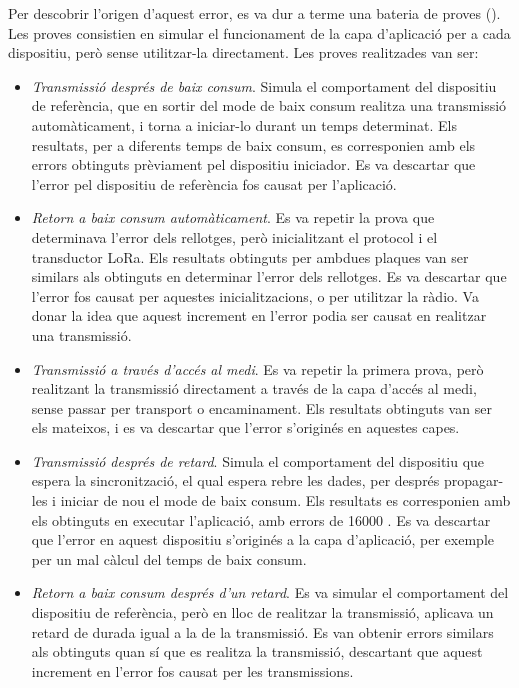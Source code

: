 \documentclass{tfgitic}[2024/07/01]
\begin{document}
{Per descobrir l'origen d'aquest error, es va dur a terme una bateria de proves (). Les proves consistien en simular el funcionament de la capa d'aplicació per a cada dispositiu, però sense utilitzar-la directament. Les proves realitzades van ser:
\begin{itemize}
    \item \emph{Transmissió després de baix consum}. Simula el comportament del dispositiu de referència, que en sortir del mode de baix consum realitza una transmissió automàticament, i torna a iniciar-lo durant un temps determinat. Els resultats, per a diferents temps de baix consum, es corresponien amb els errors obtinguts prèviament pel dispositiu iniciador. Es va descartar que l'error pel dispositiu de referència fos causat per l'aplicació.
    \item \emph{Retorn a baix consum automàticament}. Es va repetir la prova que determinava l'error dels rellotges, però inicialitzant el protocol i el transductor LoRa. Els resultats obtinguts per ambdues plaques van ser similars als obtinguts en determinar l'error dels rellotges. Es va descartar que l'error fos causat per aquestes inicialitzacions, o per utilitzar la ràdio. Va donar la idea que aquest increment en l'error podia ser causat en realitzar una transmissió.
    \item \emph{Transmissió a través d'accés al medi}. Es va repetir la primera prova, però realitzant la transmissió directament a través de la capa d'accés al medi, sense passar per transport o encaminament. Els resultats obtinguts van ser els mateixos, i es va descartar que l'error s'originés en aquestes capes.
    \item \emph{Transmissió després de retard}. Simula el comportament del dispositiu que espera la sincronització, el qual espera rebre les dades, per després propagar-les i iniciar de nou el mode de baix consum. Els resultats es corresponien amb els obtinguts en executar l'aplicació, amb errors de 16000 . Es va descartar que l'error en aquest dispositiu s'originés a la capa d'aplicació, per exemple per un mal càlcul del temps de baix consum.
    \item \emph{Retorn a baix consum després d'un retard}. Es va simular el comportament del dispositiu de referència, però en lloc de realitzar la transmissió, aplicava un retard de durada igual a la de la transmissió. Es van obtenir errors similars als obtinguts quan sí que es realitza la transmissió, descartant que aquest increment en l'error fos causat per les transmissions.  
\end{itemize}

}
\end{document}
